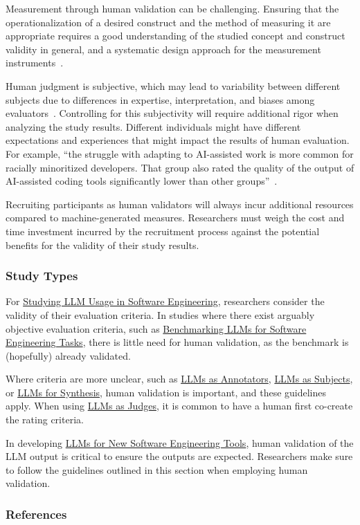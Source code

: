 Measurement through human validation can be challenging.
Ensuring that the operationalization of a desired construct and the method of measuring it are appropriate requires a good understanding of the studied concept and construct validity in general, and a systematic design approach for the measurement instruments~\cite{DBLP:journals/tse/SjobergB23}.

Human judgment is subjective, which may lead to variability between different subjects due to differences in expertise, interpretation, and biases among evaluators~\cite{DBLP:journals/pacmhci/McDonaldSF19}.
Controlling for this subjectivity will require additional rigor when analyzing the study results.
Different individuals might have different expectations and experiences that might impact the results of human evaluation. For example, \enquote{the struggle with adapting to AI-assisted work is more common for racially minoritized developers. That group also rated the quality of the output of AI-assisted coding tools significantly lower than other groups}~\cite{hicks_lee_foster-marks_2025}.

Recruiting participants as human validators will always incur additional resources compared to machine-generated measures.
Researchers must weigh the cost and time investment incurred by the recruitment process against the potential benefits for the validity of their study results.

\subsubsection{Study Types}

For \href{/study-types/#studying-llm-usage-in-software-engineering}{Studying LLM Usage in Software Engineering}, researchers \should consider the validity of their evaluation criteria.
In studies where there exist arguably objective evaluation criteria, such as \href{/study-types/#benchmarking-llms-for-software-engineering-tasks}{Benchmarking LLMs for Software Engineering Tasks}, there is little need for human validation, as the benchmark is (hopefully) already validated.

Where criteria are more unclear, such as \href{/study-types/#llms-as-annotators}{LLMs as Annotators}, \href{/study-types/#llms-as-subjects}{LLMs as Subjects}, or \href{/study-types/#llms-for-synthesis}{LLMs for Synthesis}, human validation is important, and these guidelines apply. When using \href{/study-types/#llms-as-judges}{LLMs as Judges}, it is common to have a human first co-create the rating criteria. 

In developing \href{/study-types/#llms-for-new-software-engineering-tools}{LLMs for New Software Engineering Tools}, human validation of the LLM output is critical to ensure the outputs are expected.
Researchers \should make sure to follow the guidelines outlined in this section when employing human validation.

\subsubsection{References}





